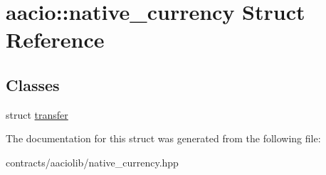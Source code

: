 \hypertarget{structaacio_1_1native__currency}{}\section{aacio\+:\+:native\+\_\+currency Struct Reference}
\label{structaacio_1_1native__currency}
\subsection*{Classes}
\begin{DoxyCompactItemize}
\item 
struct \mbox{\hyperlink{structaacio_1_1native__currency_1_1transfer}{transfer}}
\end{DoxyCompactItemize}


The documentation for this struct was generated from the following file\+:\begin{DoxyCompactItemize}
\item 
contracts/aaciolib/native\+\_\+currency.\+hpp\end{DoxyCompactItemize}
